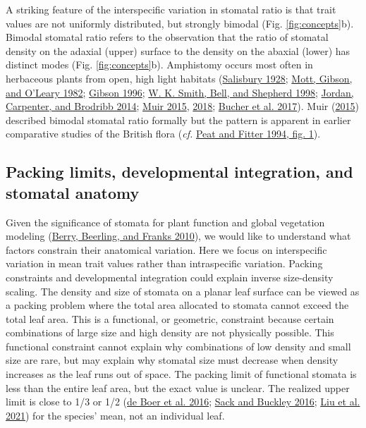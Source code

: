 \documentclass[
  12pt,
]{article}
\begin{document}
A striking feature of the interspecific variation in stomatal ratio is that trait values are not uniformly distributed, but strongly bimodal (Fig. \ref{fig:concepts}b). Bimodal stomatal ratio refers to the observation that the ratio of stomatal density on the adaxial (upper) surface to the density on the abaxial (lower) has distinct modes (Fig. \ref{fig:concepts}b). Amphistomy occurs most often in herbaceous plants from open, high light habitats (\protect\hyperlink{ref-salisbury_i_1928}{Salisbury 1928}; \protect\hyperlink{ref-mott_adaptive_1982}{Mott, Gibson, and O'Leary 1982}; \protect\hyperlink{ref-gibson_structure-function_1996}{Gibson 1996}; \protect\hyperlink{ref-smith_associations_1998}{W. K. Smith, Bell, and Shepherd 1998}; \protect\hyperlink{ref-jordan_using_2014}{Jordan, Carpenter, and Brodribb 2014}; \protect\hyperlink{ref-muir_making_2015}{Muir 2015}, \protect\hyperlink{ref-muir_light_2018}{2018}; \protect\hyperlink{ref-bucher_stomatal_2017}{Bucher et al. 2017}). Muir (\protect\hyperlink{ref-muir_making_2015}{2015}) described bimodal stomatal ratio formally but the pattern is apparent in earlier comparative studies of the British flora (\emph{cf.} \protect\hyperlink{ref-peat_comparative_1994}{Peat and Fitter 1994, fig. 1}).

\hypertarget{packing-limits-developmental-integration-and-stomatal-anatomy}{%
\subsection{Packing limits, developmental integration, and stomatal anatomy}\label{packing-limits-developmental-integration-and-stomatal-anatomy}}

Given the significance of stomata for plant function and global vegetation modeling (\protect\hyperlink{ref-berry_stomata:_2010}{Berry, Beerling, and Franks 2010}), we would like to understand what factors constrain their anatomical variation. Here we focus on interspecific variation in mean trait values rather than intraspecific variation. Packing constraints and developmental integration could explain inverse size-density scaling. The density and size of stomata on a planar leaf surface can be viewed as a packing problem where the total area allocated to stomata cannot exceed the total leaf area. This is a functional, or geometric, constraint because certain combinations of large size and high density are not physically possible. This functional constraint cannot explain why combinations of low density and small size are rare, but may explain why stomatal size must decrease when density increases as the leaf runs out of space. The packing limit of functional stomata is less than the entire leaf area, but the exact value is unclear. The realized upper limit is close to 1/3 or 1/2 (\protect\hyperlink{ref-de_boer_optimal_2016}{de Boer et al. 2016}; \protect\hyperlink{ref-sack_developmental_2016}{Sack and Buckley 2016}; \protect\hyperlink{ref-liu_scaling_2021}{Liu et al. 2021}) for the species' mean, not an individual leaf.
\end{document}
